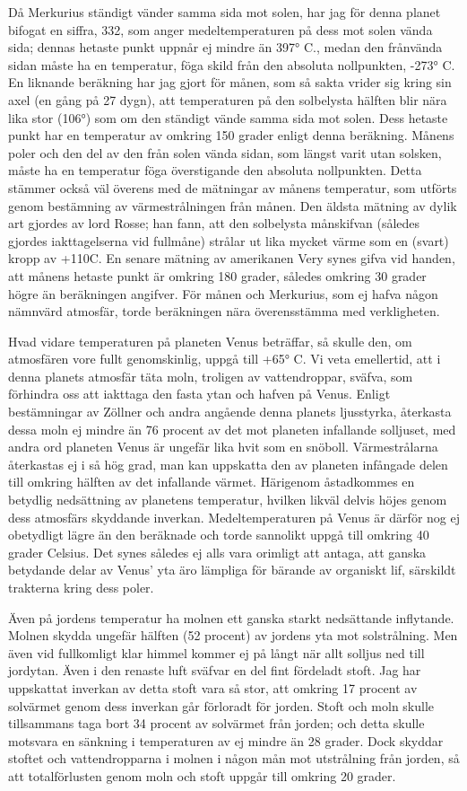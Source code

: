 \documentclass[a4paper, 12pt, oneside, swedish]{article}
\begin{document}
Då Merkurius ständigt vänder samma sida mot solen, har jag för denna planet bifogat en siffra, 332, som anger medeltemperaturen på dess mot solen vända sida; dennas hetaste punkt uppnår ej mindre än 397° C., medan den frånvända sidan måste ha en temperatur, föga skild från den absoluta nollpunkten, -273° C. En liknande beräkning har jag gjort för månen, som så sakta vrider sig kring sin axel (en gång på 27 dygn), att temperaturen på den solbelysta hälften blir nära lika stor (106°) som om den ständigt vände samma sida mot solen. Dess hetaste punkt har en temperatur av omkring 150 grader enligt denna beräkning. Månens poler och den del av den från solen vända sidan, som längst varit utan solsken, måste ha en temperatur föga överstigande den absoluta nollpunkten. Detta stämmer också väl överens med de mätningar av månens temperatur, som utförts genom bestämning av värmestrålningen från månen. Den äldsta mätning av dylik art gjordes av lord Rosse; han fann, att den solbelysta månskifvan (således gjordes iakttagelserna vid fullmåne) strålar ut lika mycket värme som en (svart) kropp av +110C. En senare mätning av amerikanen Very synes gifva vid handen, att månens hetaste punkt är omkring 180 grader, således omkring 30 grader högre än beräkningen angifver. För månen och Merkurius, som ej hafva någon nämnvärd atmosfär, torde beräkningen nära överensstämma med verkligheten.

Hvad vidare temperaturen på planeten Venus beträffar, så skulle den, om atmosfären vore fullt genomskinlig, uppgå till +65° C. Vi veta emellertid, att i denna planets atmosfär täta moln, troligen av vattendroppar, sväfva, som förhindra oss att iakttaga den fasta ytan och hafven på Venus. Enligt bestämningar av Zöllner och andra angående denna planets ljusstyrka, återkasta dessa moln ej mindre än 76 procent av det mot planeten infallande solljuset, med andra ord planeten Venus är ungefär lika hvit som en snöboll. Värmestrålarna återkastas ej i så hög grad, man kan uppskatta den av planeten infångade delen till omkring hälften av det infallande värmet. Härigenom åstadkommes en betydlig nedsättning av planetens temperatur, hvilken likväl delvis höjes genom dess atmosfärs skyddande inverkan. Medeltemperaturen på Venus är därför nog ej obetydligt lägre än den beräknade och torde sannolikt uppgå till omkring 40 grader Celsius. Det synes således ej alls vara orimligt att antaga, att ganska betydande delar av Venus' yta äro lämpliga för bärande av organiskt lif, särskildt trakterna kring dess poler.

Även på jordens temperatur ha molnen ett ganska starkt nedsättande inflytande. Molnen skydda ungefär hälften (52 procent) av jordens yta mot solstrålning. Men även vid fullkomligt klar himmel kommer ej på långt när allt solljus ned till jordytan. Även i den renaste luft sväfvar en del fint fördeladt stoft. Jag har uppskattat inverkan av detta stoft vara så stor, att omkring 17 procent av solvärmet genom dess inverkan går förloradt för jorden. Stoft och moln skulle tillsammans taga bort 34 procent av solvärmet från jorden; och detta skulle motsvara en sänkning i temperaturen av ej mindre än 28 grader. Dock skyddar stoftet och vattendropparna i molnen i någon mån mot utstrålning från jorden, så att totalförlusten genom moln och stoft uppgår till omkring 20 grader.
\end{document}
